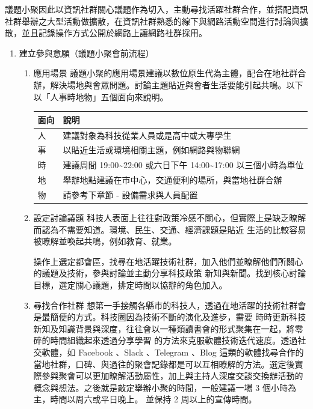\documentclass[12pt,a4paper]{article}
\begin{document}
議題小聚因此以資訊社群關心議題作為切入，主動尋找活躍社群合作，並搭配資訊社群舉辦之大型活動做擴散，在資訊社群熟悉的線下與網路活動空間進行討論與擴散，並且記錄操作方式公開於網路上讓網路社群採用。
\begin{enumerate}
\item 建立參與意願（議題小聚會前流程）
\label{sec:org84e4e70}
\begin{enumerate}
\item 應用場景
\label{sec:orgd40246b}
議題小聚的應用場景建議以數位原生代為主體，配合在地社群合辦，解決場地與會眾問題。討論主題貼近與會者生活要能引起共鳴。以下以「人事時地物」五個面向來說明。

\begin{center}
\label{tab:orgfa94d8a}
\begin{tabular}{ll}
\toprule
面向 & 說明\\
\midrule
人 & 建議對象為科技從業人員或是高中或大專學生\\
事 & 以貼近生活或環境相關主題，例如網路與物聯網\\
時 & 建議周間 19:00\textasciitilde{}22:00 或六日下午 14:00\textasciitilde{}17:00 以三個小時為單位\\
地 & 舉辦地點建議在市中心，交通便利的場所，與當地社群合辦\\
物 & 請參考下章節 - 設備需求與人員配置\\
\bottomrule
\end{tabular}
\end{center}
\item 設定討論議題
\label{sec:org413c969}
科技人表面上往往對政策冷感不關心，但實際上是缺乏暸解而認為不需要知道。環境、民生、交通、經濟課題是貼近
生活的比較容易被暸解並喚起共鳴，例如教育、就業。

操作上選定都會區，找尋在地活躍技術社群，加入他們並暸解他們所關心的議題及技術，參與討論並主動分享科技政策
新知與新聞。找到核心討論目標，選定關心議題，排定時間以協辦的角色加入。
\item 尋找合作社群
\label{sec:org510e3f1}
想第一手接觸各縣市的科技人，透過在地活躍的技術社群會是最簡便的方式。科技圈因為技術不斷的演化及進步，需要
時時更新科技新知及知識背景與深度，往往會以一種類讀書會的形式聚集在一起，將零碎的時間組織起來透過分享學習
的方法來克服軟體技術迭代速度。透過社交軟體，如 Facebook 、Slack 、Telegram 、Blog 這類的軟體找尋合作的當地社群，口碑、與過往的聚會記錄都是可以互相暸解的方法。選定後實際參與聚會可以更加暸解活動屬性，加上與主持人深度交談交換辦活動的概念與想法。之後就是敲定舉辦小聚的時間，一般建議一場 3 個小時為主，時間以周六或平日晚上。
並保持 2 周以上的宣傳時間。


\end{enumerate}
\end{enumerate}
\end{document}
